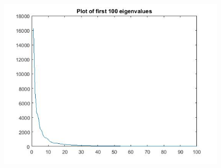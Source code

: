 \documentclass{article}
\begin{document}
\begin{figure}[H]
\includegraphics[scale =.5]{report7_eig}
\end{figure}
\end{document}

